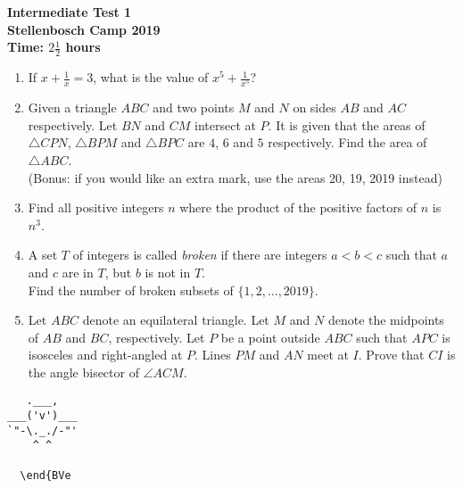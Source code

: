 \documentclass{article}
\begin{document}
\thispagestyle{empty}

\begin{center}
  \textbf{\Large Intermediate Test 1}
  \\ \vspace{1em}
  \textbf{\large Stellenbosch Camp 2019}
  \\ \vspace{1em}
  \textbf{\large Time: $2\frac{1}{2}$ hours}
\end{center}

\vspace{6.81mm}

\begin{enumerate}[1.]

\item %
If $x + \frac{1}{x} = 3$, what is the value of $x^5 + \frac{1}{x^5}$?\\
\vspace{6.81mm}

\item %
Given a triangle $ABC$ and two points $M$ and $N$ on sides $AB$ and $AC$ respectively. Let $BN$ and $CM$ intersect at $P$. It is given that the areas of $\triangle CPN$, $\triangle BPM$ and $\triangle BPC$ are $4$, $6$ and $5$ respectively.
Find the area of $\triangle ABC$.\\
(Bonus: if you would like an extra mark, use the areas 20, 19, 2019 instead)\\
\vspace{6.81mm}

\item %
Find all positive integers $n$ where the product of the positive factors of $n$ is $n^3$.\\
\vspace{6.81mm}

\item %
A set $T$ of integers is called \textit{broken} if there are integers $a < b < c$ such that $a$ and $c$ are in $T$, but $b$ is not in $T$.\\
Find the number of broken subsets of $\{1, 2, \dots, 2019\}$.\\
\vspace{6.81mm}

\item %
Let $ABC$ denote an equilateral triangle. Let $M$ and $N$ denote the midpoints of $AB$ and $BC$, respectively.
Let $P$ be a point outside $ABC$ such that $APC$ is isosceles and right-angled at $P$. Lines $PM$ and $AN$ meet at $I$.
Prove that $CI$ is the angle bisector of $\angle ACM$.\\

\end{enumerate}


\vfill
\begin{center} \begin{BVerbatim}
   .___,   
___('v')___
`"-\._./-"'
    ^ ^ 
  
  \end{BVe

\end{BVerbatim} \end{center}
\end{document}

